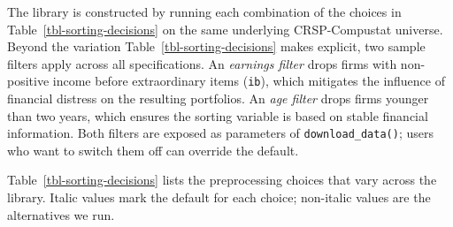 \documentclass[
  article]{jss}
\begin{document}
The library is constructed by running each combination of the choices in
Table~\ref{tbl-sorting-decisions} on the same underlying CRSP-Compustat
universe. Beyond the variation Table~\ref{tbl-sorting-decisions} makes
explicit, two sample filters apply across all specifications. An
\emph{earnings filter} drops firms with non-positive income before
extraordinary items (\texttt{ib}), which mitigates the influence of
financial distress on the resulting portfolios. An \emph{age filter}
drops firms younger than two years, which ensures the sorting variable
is based on stable financial information. Both filters are exposed as
parameters of \texttt{download\_data()}; users who want to switch them
off can override the default.

Table~\ref{tbl-sorting-decisions} lists the preprocessing choices that
vary across the library. Italic values mark the default for each choice;
non-italic values are the alternatives we run.
\end{document}
